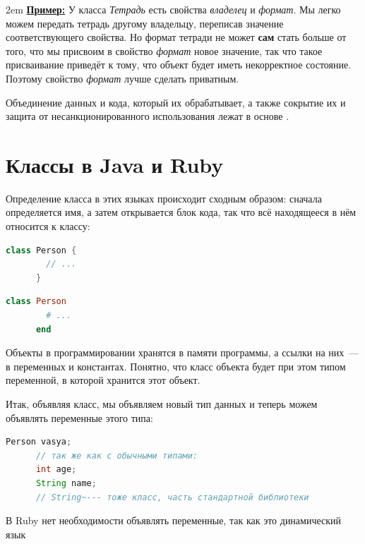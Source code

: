 \documentclass[a4paper, 14pt, titlepage]{extarticle}
\newcommand{\strong}[1]{\textbf{#1}}
\newcommand{\define}[1]{\uwave{#1}}
\newenvironment{indented}%
    { \begingroup %
        \noindent %
        \leftskip2em %
        \rightskip\leftskip }%
    { \par\endgroup }
\newenvironment{example}%
    { \begin{indented} %
        \color{dkgreen} %
        \small %
        \textbf{\underline{Пример:}} }%
    { \end{indented} }
\newenvironment{halfpage}%
    {\noindent\begin{minipage}[h]{0.49\linewidth}} %
    {\end{minipage}\hfill}
\begin{document}
  \begin{example}
    У класса \emph{Тетрадь} есть свойства \emph{владелец} и \emph{формат}. Мы легко можем передать
    тетрадь другому владельцу, переписав значение соответствующего свойства. Но формат тетради не
    может \strong{сам} стать больше от того, что мы присвоим в свойство \emph{формат} новое
    значение, так что такое присваивание приведёт к тому, что объект будет иметь некорректное
    состояние. Поэтому свойство \emph{формат} лучше сделать приватным.
  \end{example}

  Объединение данных и кода, который их обрабатывает, а также сокрытие их и защита от
  несанкционированного использования лежат в основе \define{принципа инкапсуляции}.

  \section{Классы в Java и Ruby}

  Определение класса в этих языках происходит сходным образом: сначала определяется имя, а затем
  открывается блок кода, так что всё находящееся в нём относится к классу:

  \begin{halfpage}
    \begin{lstlisting}[language=Java, title={Класс в Java}, gobble=6, texcl]
      class Person {
        // ...
      }
    \end{lstlisting}
  \end{halfpage}
  \begin{halfpage}
    \begin{lstlisting}[language=Ruby, title={Класс в Ruby}, gobble=6, texcl]
      class Person
        # ...
      end
    \end{lstlisting}
  \end{halfpage}

  Объекты в программировании хранятся в памяти программы, а ссылки на них~--- в переменных и
  константах. Понятно, что класс объекта будет при этом типом переменной, в которой хранится этот объект.

  Итак, объявляя класс, мы объявляем новый тип данных и теперь можем объявлять переменные этого типа:

  \begin{halfpage}
    \begin{lstlisting}[language=Java, title={Переменные в Java}, gobble=6, texcl]
      Person vasya;
      // так же как с обычными типами:
      int age;
      String name;
      // String~--- тоже класс, часть стандартной библиотеки
    \end{lstlisting}
  \end{halfpage}
  \begin{halfpage}
    \vspace{5mm}
    В Ruby нет необходимости объявлять
    переменные, так как это динамический язык
  \end{halfpage}
\end{document}
